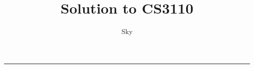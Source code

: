 \documentclass{article}
\begin{document}
\title{Solution to CS3110}
\author{Sky}
\maketitle

\hrule
\vspace{1em}


\end{document}
